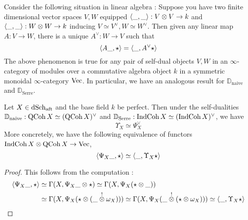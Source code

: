 \documentclass[./main.tex]{subfiles}
\begin{document}
Consider the following situation in linear algebra :
Suppose you have two finite dimensional vector spaces
$V, W$ equipped $\langle\_,\_\rangle : V \otimes V \to k$ and 
$\langle\_,\_\rangle : W \otimes W \to k$ inducing $V \simeq V^\vee, W \simeq W^\vee$.
Then given any linear map $A : V \to W$,
there is a unique $A^\vee : W \to V$ such that \[
  \langle A \_ , \star \rangle = \langle \_ , A^\vee \star \rangle  
\]
The above phenomenon is true for any pair of self-dual objects $V, W$
in an $\infty$-category of modules over a commutative algebra object
$k$ in a symmetric monoidal $\infty$-category $\mathrm{Vec}$.
In particular,
we have an analogous result for $\mathbb{D}_\mathrm{naive}$ and
$\mathbb{D}_\mathrm{Serre}$.

\begin{prop}
  
  Let $X \in \mathrm{dSch}_{\mathrm{aft}}$ and the base field $k$ be perfect.
  Then under the self-dualities 
  $\mathbb{D}_\mathrm{naive} : \mathrm{QCoh}\,X \simeq (\mathrm{QCoh}\,X)^\vee$ and
  $\mathbb{D}_{\mathrm{Serre}} : \mathrm{IndCoh}\,X \simeq (\mathrm{IndCoh}\,X)^\vee$,
  we have \[
    \Upsilon_X \simeq \Psi_X^\vee
  \]
  More concretely, we have the following equivalence of
  functors $\mathrm{IndCoh}\,X \otimes \mathrm{QCoh}\,X \to \mathrm{Vec}$,
  \[
    \langle\Psi_X \_ , \star\rangle \simeq \langle\_ , \Upsilon_X \star \rangle
  \]

  \cite[Ch 9, 9.3]{INDCOH}
\end{prop}
\begin{proof}
  This follows from the computation : 
  \begin{align*}
    \langle\Psi_X \_ , \star\rangle
    &\simeq \Gamma(X , \Psi_X \_ \otimes \star) 
      \simeq \Gamma(X , \Psi_X(\star \otimes \_)) \\
    &\simeq \Gamma(X , \Psi_X(\star \otimes (\_ \overset{!}{\otimes} \omega_X)))
      \simeq \Gamma(X , \Psi_X(\_ \overset{!}{\otimes} (\star \otimes \omega_X)))
      \simeq \langle \_ , \Upsilon_X \star\rangle
  \end{align*}
\end{proof}
\end{document}
